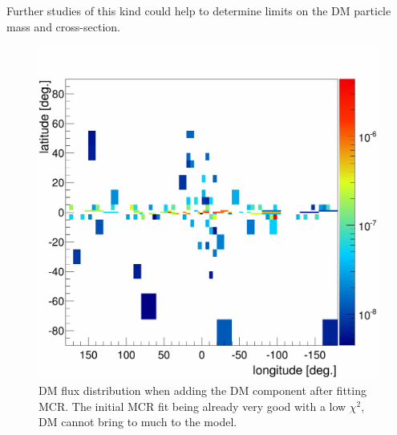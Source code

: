 Further studies of this kind could help to determine limits on the DM particle mass and cross-section.
\begin{figure}
	\centering
	\includegraphics[width=.5\linewidth]{pic/discussion/DMlate_DM_distribution.png}
	\caption[DM distribution after fitting a MCR excess]{DM flux distribution when adding the DM component after fitting MCR. The initial MCR fit being already very good with a low $\chi^2$, DM cannot bring to much to the model.}
	\label{fig:DMlate_distribution}
\end{figure}






